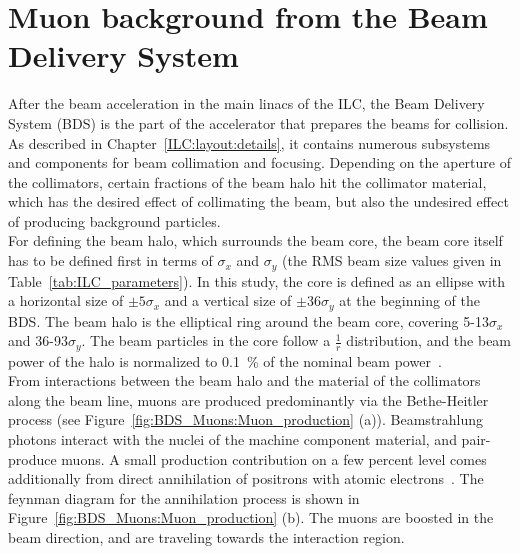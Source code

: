 \section{Muon background from the Beam Delivery System}
\label{BDS_Muons}
After the beam acceleration in the main linacs of the ILC, the Beam Delivery System (BDS) is the part of the accelerator that prepares the beams for collision.
As described in Chapter~\ref{ILC:layout:details}, it contains numerous subsystems and components for beam collimation and focusing. 
Depending on the aperture of the collimators, certain fractions of the beam halo hit the collimator material, which has the desired effect of collimating the beam, but also the undesired effect of producing background particles.
\\For defining the beam halo, which surrounds the beam core, the beam core itself has to be defined first in terms of $\sigma_x$ and $\sigma_y$ (the RMS beam size values given in Table~\ref{tab:ILC_parameters}).
In this study, the core is defined as an ellipse with a horizontal size of $\pm 5\sigma_x$ and a vertical size of $\pm 36\sigma_y$ at the beginning of the BDS.
The beam halo is the elliptical ring around the beam core, covering 5-13$\sigma_x$ and 36-93$\sigma_y$.
The beam particles in the core follow a $\frac{1}{r}$ distribution, and the beam power of the halo is normalized to \SI{0.1}{\percent} of the nominal beam power~\cite{Glens_muon_talk}.
\\From interactions between the beam halo and the material of the collimators along the beam line, muons are produced predominantly via the Bethe-Heitler process (see Figure~\ref{fig:BDS_Muons:Muon_production} (a)).
Beamstrahlung photons interact with the nuclei of the machine component material, and pair-produce muons.
A small production contribution on a few percent level comes additionally from direct annihilation of positrons with atomic electrons~\cite{MuonBkg_1TeV}.
The feynman diagram for the annihilation process is shown in Figure~\ref{fig:BDS_Muons:Muon_production} (b).
The muons are boosted in the beam direction, and are traveling towards the interaction region.\\
